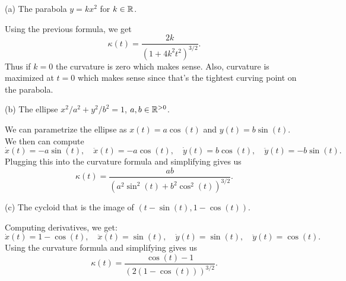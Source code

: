 \documentclass{../../templates/lkx_pset}
\begin{document}
\begin{parts}
  \begin{part}{(a)}
    The parabola $y=kx^2$ for $k\in \mathbb{R}$.
  \end{part}

  Using the previous formula, we get
  \[
    \kappa(t) = \frac{2k}{(1+4k^2t^2)^{3/2}}.
  \]
  Thus if $k=0$ the curvature is zero which makes sense. Also, curvature is maximized at $t=0$ which makes sense since that's the tightest curving point on the parabola.

  \begin{part}{(b)}
    The ellipse $x^2/a^2 + y^2/b^2=1$, $a,b\in \mathbb{R}^{>0}$.
  \end{part}

  We can parametrize the ellipse as $x(t) = a\cos(t)$ and $y(t)=b\sin(t)$. We then can compute
  \[
    \dot{x}(t) = -a\sin(t),\quad\ddot{x}(t) = -a\cos(t), \quad\dot{y}(t)=b\cos(t),\quad\ddot{y}(t)=-b\sin(t).
  \]
  Plugging this into the curvature formula and simplifying gives us
  \[
    \kappa(t) = \frac{ab}{(a^2\sin^2(t) + b^2\cos^2(t))^{3/2}}.
  \]

  \begin{part}{(c)}
    The cycloid that is the image of $(t-\sin(t), 1-\cos(t))$.
  \end{part}

  Computing derivatives, we get:
  \[
    \dot{x}(t) = 1-\cos(t),\quad\ddot{x}(t)=\sin(t),\quad\dot{y}(t)=\sin(t),\quad\ddot{y}(t)=\cos(t).
  \]
  Using the curvature formula and simplifying gives us
  \[
    \kappa(t) = \frac{\cos(t)-1}{(2(1-\cos(t)))^{3/2}}.
  \]
\end{parts}
\end{document}
